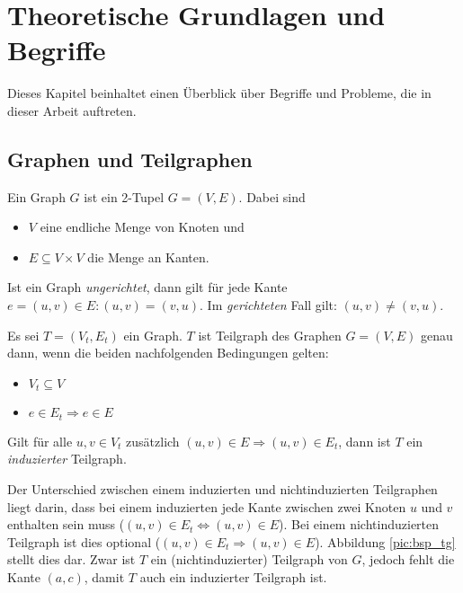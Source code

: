\chapter{Theoretische Grundlagen und Begriffe}
Dieses Kapitel beinhaltet einen Überblick über Begriffe und Probleme, die in 
dieser Arbeit auftreten.

\section{Graphen und Teilgraphen}
\begin{mydef}[Graph]Ein Graph $G$ ist ein 2-Tupel $G=(V,E)$. Dabei sind
\begin{itemize}
  \item $V$ eine endliche Menge von Knoten und
  \item $E \subseteq V \times V$ die Menge an Kanten.
\end{itemize}
Ist ein Graph \emph{ungerichtet}, dann gilt für jede Kante $e=(u,v) \in E:
(u,v)=(v,u)$. Im \emph{gerichteten} Fall gilt: $(u,v)\neq (v,u)$.
\end{mydef}

\begin{mydef}[Teilgraph]
Es sei $T=(V_t,E_t)$ ein Graph. $T$ ist Teilgraph des Graphen $G=(V,E)$ genau
dann, wenn die beiden nachfolgenden Bedingungen gelten:
\begin{itemize}
	\item $V_t \subseteq V$ 
	\item $e \in E_t \Rightarrow e \in E$
\end{itemize}
Gilt für alle $u,v \in V_t$ zusätzlich $(u,v) \in E \Rightarrow (u,v) \in E_t$, dann
ist $T$ ein \emph{induzierter} Teilgraph.\end{mydef}

Der Unterschied zwischen einem induzierten und nichtinduzierten 
Teilgraphen liegt darin, dass bei einem induzierten jede Kante 
zwischen zwei Knoten $u$ und $v$ enthalten sein muss ($(u,v) \in E_t 
\Leftrightarrow (u,v) \in E$). Bei einem nichtinduzierten Teilgraph 
ist dies optional ($(u,v) \in E_t \Rightarrow (u,v) \in E$). 
Abbildung \ref{pic:bsp_tg} stellt dies dar. Zwar ist $T$ ein (nichtinduzierter) Teilgraph 
von $G$, jedoch fehlt die Kante $(a,c)$, damit $T$ auch ein induzierter Teilgraph ist.



